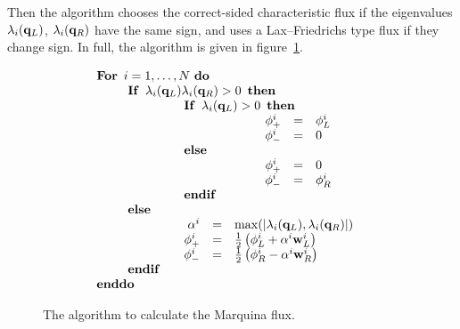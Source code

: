 \documentclass{article}
\begin{document}
Then the algorithm chooses the correct-sided characteristic flux if
the eigenvalues $\lambda_i({\bf q}_L)$, $\lambda_i({\bf q}_R)$ have
the same sign, and uses a Lax--Friedrichs type flux if they change
sign. In full, the algorithm is given in figure~\ref{fig:marqcode}.
\begin{figure}[htbp]
  \begin{center}
    \leavevmode
\begin{equation}
  \label{marqalg}
  \begin{array}[l]{l}
    {\bf For}\ \, i = 1, \dots, N\ {\bf do} \\
    \qquad \begin{array}[c]{l}
      {\bf If}\ \, \lambda_i({\bf q}_L) \lambda_i({\bf q}_R) > 0
        \ \, {\bf then} \\
      \qquad \qquad \begin{array}[c]{l}
        {\bf If}\ \,  \lambda_i({\bf q}_L) > 0 \ \, {\bf then} \\
        \qquad \qquad \qquad \begin{array}[c]{r c l}
          {\bf \phi}^i_+ & = & {\bf \phi}^i_L \\
          {\bf \phi}^i_- & = & 0
        \end{array} \\
        {\bf else}  \\
        \qquad \qquad \qquad \begin{array}[c]{r c l}
          {\rm \phi}^i_+ & = & 0 \\
          {\rm \phi}^i_- & = & {\bf \phi}^i_R
        \end{array} \\
        {\bf end if}
      \end{array} \\
      {\bf else} \\
      \qquad \qquad \begin{array}[c]{r c l}
        \alpha^i & = & {\rm max}(|\lambda_i({\bf q}_L), \lambda_i({\bf
          q}_R)|) \\
        {\bf \phi}^i_+ & = & \frac{1}{2} \left( {\bf \phi}^i_L +
          \alpha^i {\bf w}^i_L \right) \\
        {\bf \phi}^i_- & = & \frac{1}{2} \left( {\bf \phi}^i_R -
          \alpha^i {\bf w}^i_R \right)
      \end{array} \\
      {\bf end if} \\
    \end{array} \\
    {\bf end do}
  \end{array}
\end{equation}
    \caption[The algorithm to calculate the Marquina flux]{The
      algorithm to calculate the Marquina flux.}
    \label{fig:marqcode}
  \end{center}
\end{figure}
\end{document}
